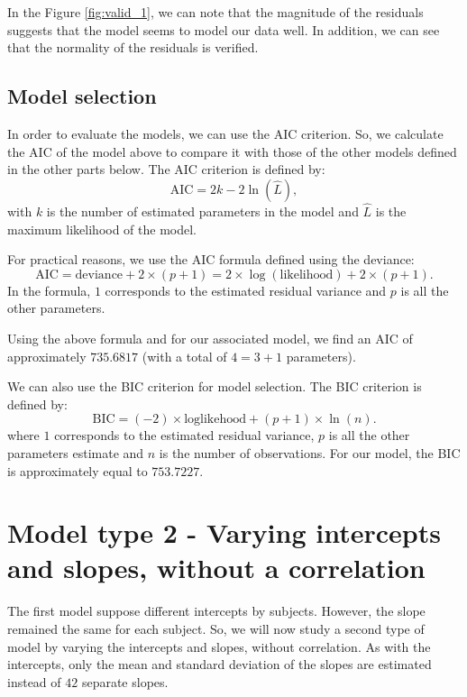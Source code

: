 \documentclass{article}
\newcommand*{\AIC}{\mathrm{AIC}}
\newcommand*{\BIC}{\mathrm{BIC}}
\begin{document}
In the Figure \ref{fig:valid_1}, we can note that the magnitude of the residuals suggests that the model seems to model our data well. In addition, we can see that the normality of the residuals is verified.

\subsection{Model selection}
In order to evaluate the models, we can use the AIC criterion.
So, we calculate the AIC of the model above to compare it with those of the other models defined in the other parts below. The AIC criterion is defined by:
\[ \AIC = 2k - 2\ln({\hat{L}}),\]
with  $k$ is the number of estimated parameters in the model and $\hat{L}$ is the maximum likelihood of the model.


For practical reasons, we use the AIC formula defined using the deviance:
$$\AIC=\text{deviance} + 2 \times (p+1)=2 \times \log(\text{likelihood}) + 2 \times (p+1).$$
In the formula, $1$ corresponds to the estimated residual variance and $p$ is all the other parameters.


Using the above formula and for our associated model, we find an AIC of approximately $735.6817$ (with a total of $4=3+1$ parameters).

We can also use the BIC criterion for model selection. The BIC criterion is defined by:
\[ \BIC= (-2) \times \text{loglikehood} + (p+1) \times \ln(n).\]
where $1$ corresponds to the estimated residual variance, $p$ is all the other parameters estimate and $n$ is the number of observations.
For our model, the BIC is approximately equal to $753.7227$.


\section{Model type 2 - Varying intercepts and slopes, without a correlation}

The first model suppose different intercepts by subjects. However, the slope remained the same for each subject. So, we will now study a second type of model by varying the intercepts and slopes, without correlation. 
As with the intercepts, only the mean and standard deviation of the slopes are estimated instead of $42$ separate slopes.
\end{document}
